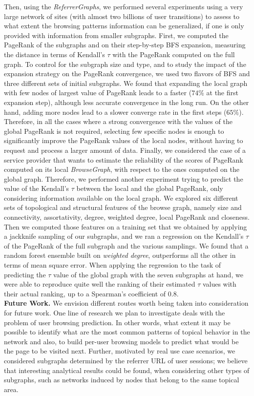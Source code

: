 \documentclass{sig-alternate-2013}
\newcommand{\rgraphs}{\textit{ReferrerGraphs}}
\newcommand{\bgraph}{\textit{BrowseGraph}}
\begin{document}
Then, using the \rgraphs, we performed several experiments using a very
large network of sites (with almost two billions of user transitions) to assess
to what extent the browsing patterns information can be generalized, if one is
only provided with information from smaller subgraphs.
% 
First, we computed the PageRank of the subgraphs and on their step-by-step BFS
expansion, measuring the distance in terms of Kendall's $\tau$ with the
PageRank computed on the full graph. To control for the subgraph size and type,
and to study the impact of the expansion strategy on the PageRank convergence,
we used two flavors of BFS and three different sets of initial subgraphs.
% 
We found that expanding the local graph with few nodes of largest value of
PageRank leads to a faster ($74\%$ at the first expansion step), although less accurate convergence in the long run. On the other hand, adding more nodes lead to a slower converge rate in the first steps ($65\%$). 
Therefore, in all the cases where a strong convergence with the values of
the global PageRank is not required, selecting few specific nodes is enough to
significantly improve the PageRank values of the local nodes, without having to request
and process a larger amount of data.
Finally, we considered the case of a service provider that wants to estimate the reliability of the scores of PageRank computed on its local \bgraph, with respect to the ones computed on the global graph. 
Therefore, we performed another experiment trying to predict the value of the
Kendall's $\tau$ between the local and the global PageRank, only considering
information available on the local graph. We explored six different sets of
topological and structural features of the browse graph, namely size and
connectivity, assortativity, degree, weighted degree, local PageRank and
closeness. Then we computed those features on a training set that we obtained by applying
a jackknife sampling of our subgraphs, and we ran a regression on the Kendall's
$\tau$ of the PageRank of the full subgraph and the various samplings. We found
that a random forest ensemble built on \emph{weighted degree}, outperforms all
the other in terms of mean square error. When applying the regression to the
task of predicting the $\tau$ value of the global graph with the seven subgraphs
at hand, we were able to reproduce quite well the ranking of their estimated
$\tau$ values with their actual ranking, up to a Spearman's coefficient of 0.8. \\

\noindent
\textbf{Future Work. }
We envision different routes worth being taken into consideration for future work.
One line of research we plan to investigate deals with the problem of user browsing prediction. In other words, what extent it may be possible to identify what are the most common patterns of topical behavior in the network and also, to build per-user browsing models to predict what would be the page to be visited next. 
Further, motivated by real use case scenarios,
we considered subgraphs determined by the referrer URL of user sessions;
we believe that interesting analytical results could be found, when considering
other types of subgraphs, such as networks induced by nodes that belong to the same
topical area.
\end{document}
